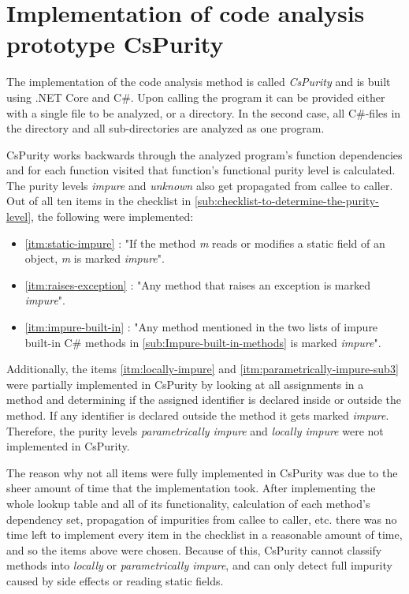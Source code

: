 \documentclass[a4paper,12pt]{article}
\newcommand{\Autoref}[1]{%
  \begingroup%
  \def\chapterautorefname{Chapter}%
  \def\sectionautorefname{Section}%
  \def\subsectionautorefname{Subsection}%
  \def\itemautorefname{Item}%
  \autoref{#1}%
  \endgroup%
}
\begin{document}
\section{Implementation of code analysis prototype CsPurity} \label{sec:implementation-of-cspurity}


The implementation of the code analysis method is called \textit{CsPurity} and is built using .NET Core and C\#. Upon calling the program it can be provided either with a single file to be analyzed, or a directory. In the second case, all C\#-files in the directory and all sub-directories are analyzed as one program.

CsPurity works backwards through the analyzed program's function dependencies and for each function visited that function's functional purity level is calculated. The purity levels \textit{impure} and \textit{unknown} also get propagated from callee to caller. Out of all ten items in the checklist in \autoref{sub:checklist-to-determine-the-purity-level}, the following were implemented:

\begin{itemize}
  \item \Autoref{itm:static-impure}: "If the method \textit{m} reads or modifies a static field of an object, \textit{m} is marked \textit{impure}".
  \item \Autoref{itm:raises-exception}: "Any method that raises an exception is marked \textit{impure}".
  \item \Autoref{itm:impure-built-in}: "Any method mentioned in the two lists of impure built-in C\# methods in \autoref{sub:Impure-built-in-methods} is marked \textit{impure}".
\end{itemize}


Additionally, the items \ref{itm:locally-impure} and \ref{itm:parametrically-impure-sub3} were partially implemented in CsPurity by looking at all assignments in a method and determining if the assigned identifier is declared inside or outside the method. If any identifier is declared outside the method it gets marked \textit{impure}. Therefore, the purity levels \textit{parametrically impure} and \textit{locally impure} were not implemented in CsPurity.

The reason why not all items were fully implemented in CsPurity was due to the sheer amount of time that the implementation took. After implementing the whole lookup table and all of its functionality, calculation of each method's dependency set, propagation of impurities from callee to caller, etc. there was no time left to implement every item in the checklist in a reasonable amount of time, and so the items above were chosen. Because of this, CsPurity cannot classify methods into \textit{locally} or \textit{parametrically impure}, and can only detect full impurity caused by side effects or reading static fields.
\end{document}
